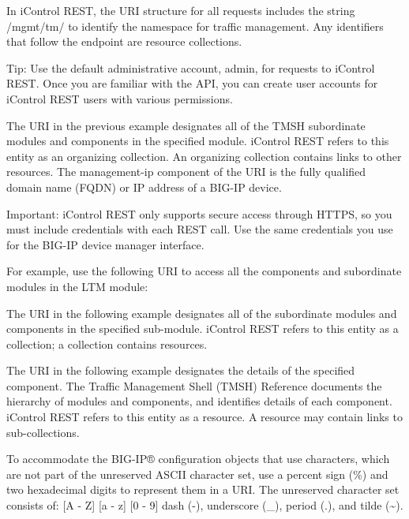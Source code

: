 \documentclass[letterpaper,10pt,english]{sphinxmanual}
\begin{document}
In iControl REST, the URI structure for all requests includes the string
/mgmt/tm/ to identify the namespace for traffic management. Any
identifiers that follow the endpoint are resource collections.

Tip: Use the default administrative account, admin, for requests to
iControl REST. Once you are familiar with the API, you can create user
accounts for iControl REST users with various permissions.


The URI in the previous example designates all of the TMSH subordinate
modules and components in the specified module. iControl REST refers to
this entity as an organizing collection. An organizing collection
contains links to other resources. The management-ip component of the
URI is the fully qualified domain name (FQDN) or IP address of a BIG-IP
device.

Important: iControl REST only supports secure access through HTTPS, so
you must include credentials with each REST call. Use the same
credentials you use for the BIG-IP device manager interface.

For example, use the following URI to access all the components and
subordinate modules in the LTM module:


The URI in the following example designates all of the subordinate
modules and components in the specified sub-module. iControl REST refers
to this entity as a collection; a collection contains resources.


The URI in the following example designates the details of the specified
component. The Traffic Management Shell (TMSH) Reference documents the
hierarchy of modules and components, and identifies details of each
component. iControl REST refers to this entity as a resource. A resource
may contain links to sub-collections.



To accommodate the BIG-IP® configuration objects that use characters,
which are not part of the unreserved ASCII character set, use a percent
sign (\%) and two hexadecimal digits to represent them in a URI. The
unreserved character set consists of: {[}A - Z{]} {[}a - z{]} {[}0 - 9{]} dash (-),
underscore (\_), period (.), and tilde (\textasciitilde{}).
\end{document}
